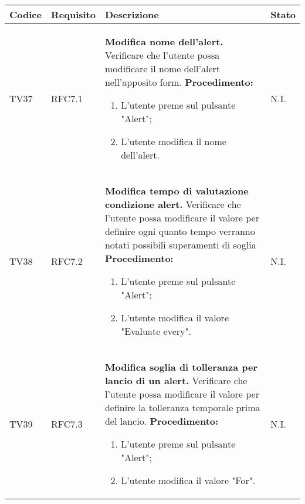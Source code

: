 \begin{table}[!htpb]
	\centering
	\renewcommand{\arraystretch}{2} 
	\begin{tabular}{|l|l|p{10cm}|l|}
		\rowcolor{orange!50}
		\hline
		\textbf{Codice} & \textbf{Requisito}& \textbf{Descrizione} & \textbf{Stato}\\ 
		\hline
		TV37 & RFC7.1 &
			\textbf{Modifica nome dell’alert.}
			\newline
			Verificare che l'utente possa modificare il nome dell’alert nell’apposito form.
			\newline
			\textbf{Procedimento:}
			\begin{enumerate}
				\item L’utente preme sul pulsante "Alert";
				\item L’utente modifica il nome dell’alert.
			\end{enumerate} 
			& N.I.\\
		\hline
		TV38 & RFC7.2 &
			\textbf{Modifica tempo di valutazione condizione alert.}
			\newline
			Verificare che l'utente possa modificare il valore per definire ogni quanto tempo verranno notati possibili superamenti di soglia
			\newline
			\textbf{Procedimento:}
			\begin{enumerate}
				\item L’utente preme sul pulsante "Alert";
				\item L’utente modifica il valore "Evaluate every".
			\end{enumerate} 
			& N.I.\\
		\hline
		TV39 & RFC7.3 &
			\textbf{Modifica soglia di tolleranza per lancio di un alert.}
			\newline
			Verificare che l'utente possa modificare il valore per definire la tolleranza temporale prima del lancio.
			\newline
			\textbf{Procedimento:}
			\begin{enumerate}
				\item L’utente preme sul pulsante "Alert";
				\item L’utente modifica il valore "For".
			\end{enumerate} 
			& N.I.\\
		\hline
	\end{tabular}
\end{table}

